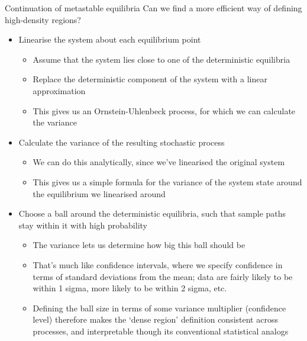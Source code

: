 \documentclass[presentation]{beamer}
\begin{document}
\begin{frame}[label={sec:org8556021},plain]{Continuation of metastable equilibria}
Can we find a more efficient way of defining high-density regions?
\vfill
\begin{itemize}
\item Linearise the system about each equilibrium point
\begin{itemize}
\item Assume that the system lies close to one of the deterministic equilibria
\item Replace the deterministic component of the system with a linear approximation
\item This gives us an Ornstein-Uhlenbeck process, for which we can calculate the variance
\end{itemize}
\end{itemize}
\vfill
\begin{itemize}
\item Calculate the variance of the resulting stochastic process
\begin{itemize}
\item We can do this analytically, since we've linearised the original system
\item This gives us a simple formula for the variance of the system state around the equilibrium we linearised around
\end{itemize}
\end{itemize}
\vfill
\begin{itemize}
\item Choose a ball around the deterministic equilibria, such that sample paths stay within it with high probability
\begin{itemize}
\item The variance lets us determine how big this ball should be
\item That's much like confidence intervals, where we specify confidence in terms of standard deviations from the mean; data are fairly likely to be within 1 sigma, more likely to be within 2 sigma, etc.
\item Defining the ball size in terms of some variance multiplier (confidence level) therefore makes the `dense region' definition consistent across processes, and interpretable though its conventional statistical analogs
\end{itemize}
\end{itemize}
\end{frame}
\end{document}
